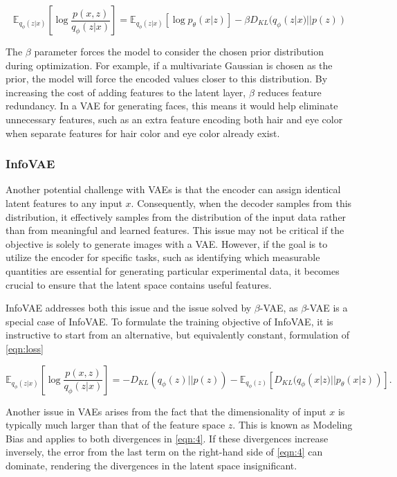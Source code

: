 \begin{equation}\label{eqn:beta}
 \mathbb{E}_{q_\phi(z|x)}\left[\log \frac{p(x,z)}{q_\phi(z|x)}  \right]
 = \mathbb{E}_{q_\phi(z|x)}[\log p_\theta (x|z)] -\beta D_{KL}(q_\phi(z|x)||p(z))
\end{equation}


The $\beta$ parameter forces the model to consider the chosen prior distribution during optimization. For example, if a multivariate Gaussian is chosen as the prior, the model will force the encoded values closer to this distribution. By increasing the cost of adding features to the latent layer, $\beta$ reduces feature redundancy. In a VAE for generating faces, this means it would help eliminate unnecessary features, such as an extra feature encoding both hair and eye color when separate features for hair color and eye color already exist.

\subsubsection{InfoVAE}

Another potential challenge with VAEs is that the encoder can assign identical latent features to any input $x$. Consequently, when the decoder samples from this distribution, it effectively samples from the distribution of the input data rather than from meaningful and learned features. This issue may not be critical if the objective is solely to generate images with a VAE. However, if the goal is to utilize the encoder for specific tasks, such as identifying which measurable quantities are essential for generating particular experimental data, it becomes crucial to ensure that the latent space contains useful features.

InfoVAE addresses both this issue and the issue solved by $\beta$-VAE, as $\beta$-VAE is a special case of InfoVAE. To formulate the training objective of InfoVAE, it is instructive to start from an alternative, but equivalently constant, formulation of \autoref{eqn:loss} \citep{Zhao}

\begin{equation} \label{eqn:4}
 \mathbb{E}_{q_\phi(z|x)}\left[\log \frac{p(x,z)}{q_\phi(z|x)}  \right]
 =-D_{KL}(q_\phi(z)||p(z))-\mathbb{E}_{q_\phi(z)}[D_{KL}(q_\phi(x|z)||p_\theta(x|z))].
\end{equation}

Another issue in VAEs arises from the fact that the dimensionality of input $x$ is typically much larger than that of the feature space $z$. This is known as Modeling Bias and applies to both divergences in \autoref{eqn:4}. If these divergences increase inversely, the error from the last term on the right-hand side of \autoref{eqn:4} can dominate, rendering the divergences in the latent space insignificant.

